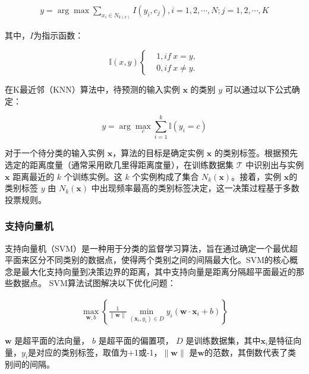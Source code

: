 \documentclass[a4paper, 10pt]{article}
\begin{document}
	\begin{equation}
		\begin{aligned}
			y = \arg\max \sum_{x_i \in N_{k(x)}} I \left(y_i, c_j\right), i = 1,2, \cdots, N; j = 1,2, \cdots, K
		\end{aligned}
		\label{eq: knn}
	\end{equation}
	
	其中，$I$为指示函数：
	
	\begin{equation}
		\mathbb{I} \left( x,y\right)
		\left\{
		\begin{aligned}
			&1, if \ x=y ,\\
			&0, if \ x\neq y.
		\end{aligned}
		\right.
	\end{equation}
	
	在K最近邻（KNN）算法中，待预测的输入实例 $\mathbf{x}$ 的类别 $y$ 可以通过以下公式确定：
	
	\begin{equation}
		y = \arg\max_{c} \sum_{i=1}^{k} \mathbb{I} (y_i = c)
	\end{equation}
	
	对于一个待分类的输入实例 $\mathbf{x}$，算法的目标是确定实例 $\mathbf{x}$ 的类别标签。根据预先选定的距离度量（通常采用欧几里得距离度量），在训练数据集 $\mathcal{T}$ 中识别出与实例 $\mathbf{x}$ 距离最近的 $k$ 个训练实例。这 $k$ 个实例构成了集合 $N_k(\mathbf{x}) $。接着，实例 $\mathbf{x} $的类别标签 $y$ 由 $N_k(\mathbf{x})$ 中出现频率最高的类别标签决定，这一决策过程基于多数投票规则。
	
	
	\subsubsection{支持向量机}
	
	支持向量机（SVM）是一种用于分类的监督学习算法，旨在通过确定一个最优超平面来区分不同类别的数据点，使得两个类别之间的间隔最大化。SVM的核心概念是最大化支持向量到决策边界的距离，其中支持向量是距离分隔超平面最近的那些数据点。
	SVM算法试图解决以下优化问题：
	
	\begin{equation}
		\begin{aligned}
			\max_{\mathbf{w}, b} \left\{ \frac{1}{\|\mathbf{w}\|} \min_{(\mathbf{x}_i, y_i) \in D} y_i(\mathbf{w} \cdot \mathbf{x}_i + b) \right\}
		\end{aligned}
		\label{eq: svm}
	\end{equation}
	
	$\mathbf{w}$ 是超平面的法向量， $b$ 是超平面的偏置项， $D$ 是训练数据集，其中$\mathbf{x}_i$是特征向量，$y_i$是对应的类别标签，取值为+1或-1，$ \|\mathbf{w}\|$ 是$ \mathbf{w}$的范数，其倒数代表了类别间的间隔。
	
\end{document}
